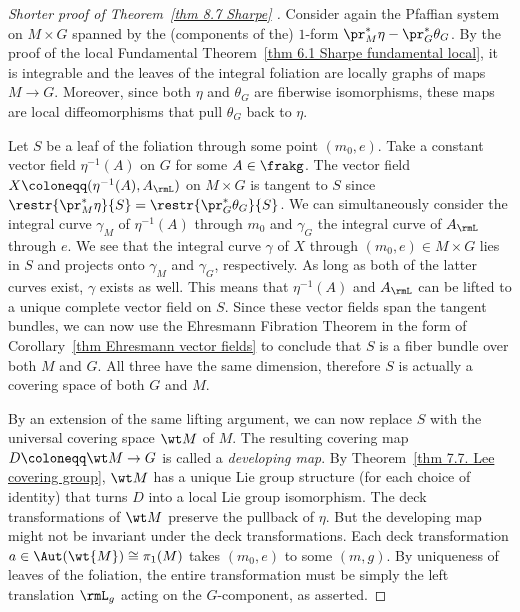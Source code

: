 \begin{proof}[Shorter proof of Theorem~\ref{thm 8.7 Sharpe} {{\cite[Thm.~2.8]{McKayCartan}}}]
    Consider again the Pfaffian system on $M\times G$ spanned by the (components of the) $1$-form $\pr_M^\ast\eta-\pr_G^\ast\theta_G$. By the proof of the local Fundamental Theorem~\ref{thm 6.1 Sharpe fundamental local}, it is integrable and the leaves of the integral foliation are locally graphs of maps $M\to G$. Moreover, since both $\eta$ and $\theta_G$ are fiberwise isomorphisms, these maps are local diffeomorphisms that pull $\theta_G$ back to $\eta$. 
    
    Let $S$ be a leaf of the foliation through some point $(m_0,e)$. Take a constant vector field $\eta^{-1}(A)$ on $G$ for some $A\in\frakg$. The vector field $X\coloneqq (\eta^{-1}(A),A_\rmL)$ on $M\times G$ is tangent to $S$ since $\restr{\pr_M^\ast\eta}{S}=\restr{\pr^\ast_G\theta_G}{S}$. We can simultaneously consider the integral curve $\gamma_M$ of $\eta^{-1}(A)$ through $m_0$ and $\gamma_G$ the integral curve of $A_\rmL$ through $e$. We see that the integral curve $\gamma$ of $X$ through $(m_0,e)\in M\times G$ lies in $S$ and projects onto $\gamma_M$ and $\gamma_G$, respectively. As long as both of the latter curves exist, $\gamma$ exists as well. This means that $\eta^{-1}(A)$ and $A_\rmL$ can be lifted to a unique complete vector field on $S$. Since these vector fields span the tangent bundles, we can now use the Ehresmann Fibration Theorem in the form of Corollary~\ref{thm Ehresmann vector fields} to conclude that $S$ is a fiber bundle over both $M$ and $G$. All three have the same dimension, therefore $S$ is actually a covering space of both $G$ and $M$. 
    
    By an extension of the same lifting argument, we can now replace $S$ with the universal covering space $\wt M$ of $M$. The resulting covering map $D\coloneqq \wt M\to G$ is called a \emph{developing map}. 
    By Theorem~\ref{thm 7.7. Lee covering group}, $\wt M$ has a unique Lie group structure (for each choice of identity) that turns $D$ into a local Lie group isomorphism. The deck transformations of $\wt M$ preserve the pullback of $\eta$. But the developing map might not be invariant under the deck transformations. Each deck transformation $a\in \Aut(\wt{M})\cong \pi_1(M)$ takes $(m_0,e)$ to some $(m,g)$. By uniqueness of leaves of the foliation, the entire transformation must be simply the left translation $\rmL_g$ acting on the $G$-component, as asserted.
\end{proof}

